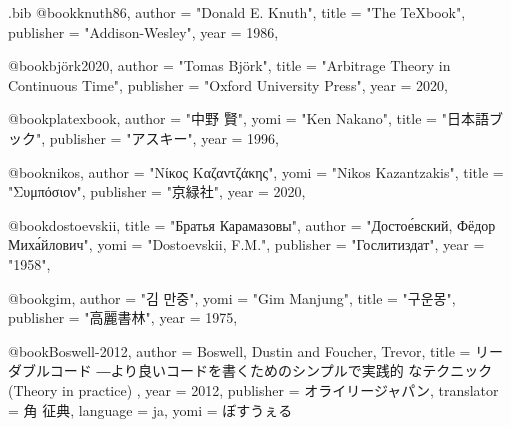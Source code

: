 
\begin{filecontents}[overwrite]{\jobname.bib}
@book{knuth86,
  author    = "Donald E. Knuth",
  title     = "The \TeX book",
  publisher = "Addison-Wesley",
  year      = 1986,
}

@book{björk2020,
  author    = "Tomas Björk",
  title     = "Arbitrage Theory in Continuous Time",
  publisher = "Oxford University Press",
  year      = 2020,
}

@book{platexbook,
  author    = "中野 賢",
  yomi      = "Ken Nakano",
  title     = "日本語{\LaTeXe}ブック",
  publisher = "アスキー",
  year      = 1996,
}

@book{nikos,
  author    = "Νίκος Καζαντζάκης",
  yomi      = "Nikos Kazantzakis",
  title     = "Συμπόσιον",
  publisher = "京緑社",
  year      = 2020,
}

@book{dostoevskii,
  title     = "Братья Карамазовы",
  author    = "Достое́вский, Фёдор Миха́йлович",
  yomi      = "Dostoevskii, F.M.",
  publisher = "Гослитиздат",
  year      = "1958",
}

@book{gim,
  author    = "김 만중",
  yomi      = "Gim Manjung",
  title     = "구운몽",
  publisher = "高麗書林",
  year      = 1975,
}

@book{Boswell-2012,
  author     = {Boswell, Dustin and Foucher, Trevor},
  title      = {リーダブルコード ―より良いコードを書くためのシンプルで実践的
                なテクニック (Theory in practice) },
  year       = 2012,
  publisher  = {オライリージャパン},
  translator = {角 征典},
  language   = {ja},
  yomi       = {ぼすうぇる}
}
\end{filecontents}

\documentclass{ltjsarticle}
\usepackage{luatexja-fontspec}
\setmainfont{XITS}

test
\nocite{*}



